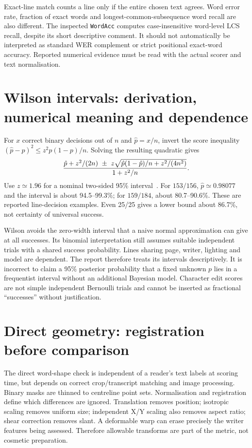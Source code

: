 Exact-line match counts a line only if the entire chosen text agrees.
Word error rate, fraction of exact words and longest-common-subsequence
word recall are also different. The inspected \texttt{WordAcc} computes
case-insensitive word-level LCS recall, despite its short descriptive comment.
It should not automatically be interpreted as standard WER complement or
strict positional exact-word accuracy. Reported numerical evidence must be
read with the actual scorer and text normalisation.

\section{Wilson intervals: derivation, numerical meaning and dependence}
For $x$ correct binary decisions out of $n$ and $\hat p=x/n$, invert the
score inequality $(\hat p-p)^2\le z^2p(1-p)/n$. Solving the resulting
quadratic gives
\[
{\hat p+z^2/(2n)\ \pm\ z\sqrt{\hat p(1-\hat p)/n+z^2/(4n^2)}
\over1+z^2/n}.
\]
Use $z\simeq1.96$ for a nominal two-sided 95\% interval~\cite{wilson1927,nistinterval}.
For $153/156$, $\hat p\simeq0.98077$ and the interval is about
94.5--99.3\%; for $159/184$, about 80.7--90.6\%. These are reported
line-decision examples. Even 25/25 gives a lower bound about 86.7\%, not
certainty of universal success.

Wilson avoids the zero-width interval that a naive normal approximation
can give at all successes. Its binomial interpretation still assumes suitable
independent trials with a shared success probability. Lines sharing page,
writer, lighting and model are dependent. The report therefore treats its
intervals descriptively. It is incorrect to claim a 95\% posterior probability
that a fixed unknown $p$ lies in a frequentist interval without an additional
Bayesian model. Character edit scores are not simple independent Bernoulli
trials and cannot be inserted as fractional ``successes'' without justification.

\section{Direct geometry: registration before comparison}
The direct word-shape check is independent of a reader's text labels at
scoring time, but depends on correct crop/transcript matching and image
processing. Binary masks are thinned to centreline point sets. Normalisation
and registration define which differences are ignored. Translation removes
position; isotropic scaling removes uniform size; independent X/Y scaling
also removes aspect ratio; shear correction removes slant. A deformable warp
can erase precisely the writer features being assessed. Therefore allowable
transforms are part of the metric, not cosmetic preparation.

